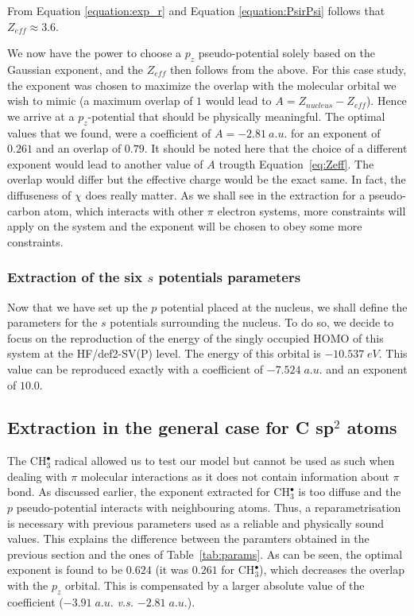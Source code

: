 \documentclass[aip,reprint]{revtex4-1}
\begin{document}
From Equation \ref{equation:exp_r} and Equation \ref{equation:PsirPsi} follows
that \(Z_{eff} \approx 3.6\). 

We now have the power to choose a \(p_{z}\) pseudo-potential solely based on the Gaussian
exponent, and the \(Z_{eff}\) then follows from the above.
For this case study, 
the exponent was chosen to maximize the overlap with the molecular
orbital we wish to mimic (a maximum overlap of $1$ would lead to
$A=Z_{nucleus}-Z_{eff}$).
Hence we arrive at a \(p_{z}\)-potential that should be physically meaningful. 
The optimal values that we found,
were a coefficient of $A=-2.81 \ a.u.$ for 
an exponent of $0.261$ and an overlap of $0.79$. 
It should be noted here that the choice of a different exponent would lead to another value
of $A$ trougth Equation~\ref{eq:Zeff}.
The overlap would differ but the effective charge would be the exact same.
In fact, the diffuseness of $\chi$ does really matter.
As we shall see in the extraction for a pseudo-carbon atom, which interacts with other
$\pi$ electron systems, more constraints will apply on the system and the exponent
will be chosen to obey some more constraints.

\subsubsection{Extraction of the six $s$ potentials parameters}
Now that we have set up the $p$ potential placed at the nucleus, we shall define
the parameters for the $s$ potentials surrounding the nucleus.
To do so, we decide to focus on the reproduction of the energy of the singly
occupied HOMO of this system
at the HF/def2-SV(P) level. The energy of this orbital is $-10.537\;eV$.
This value can be reproduced exactly with a coefficient of $-7.524\;a.u.$
and an exponent of $10.0$.

\subsection{Extraction in the general case for C sp$^2$ atoms}
\label{section:csp2_extraction}
The CH$_3^\bullet$ radical allowed us to test our model but cannot be used
as such when dealing with $\pi$ molecular interactions as it does not contain
information about $\pi$ bond.
As discussed earlier, the exponent extracted for CH$_3^\bullet$ is too diffuse
and the $p$ pseudo-potential interacts with neighbouring atoms.
Thus, a reparametrisation is necessary with previous parameters used as a reliable
and physically sound values.
This explains the difference between the paramters obtained in the previous
section and the ones of Table~\ref{tab:params}.
As can be seen, the optimal exponent is found to be $0.624$ (it was $0.261$ for
CH$_3^\bullet$), which decreases the overlap with the $p_z$ orbital.
This is compensated by a larger absolute value of the coefficient ($-3.91\;a.u.$ \textsl{v.s.} $-2.81\;a.u.$).
\end{document}
